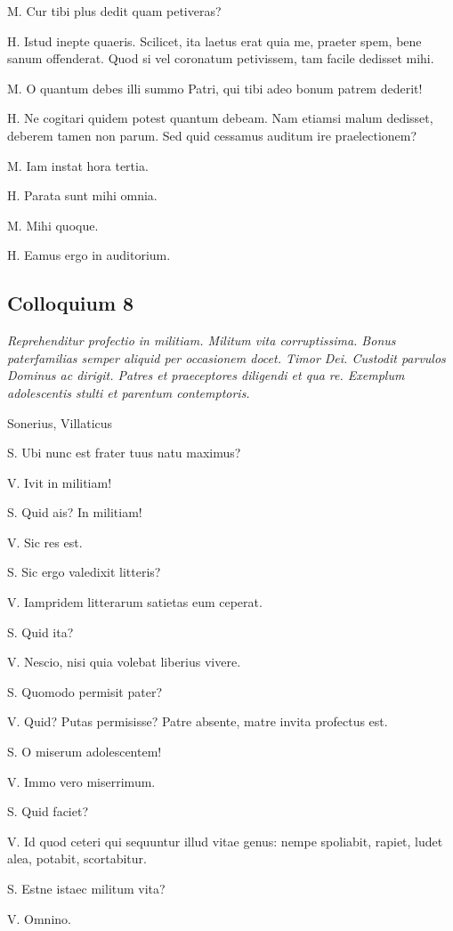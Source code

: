 \documentclass{article}
\begin{document}
M. Cur tibi plus dedit quam petiveras?

H. Istud inepte quaeris. Scilicet, ita laetus erat quia me, praeter spem, bene sanum offenderat. Quod si vel coronatum petivissem, tam facile dedisset mihi.

M. O quantum debes illi summo Patri, qui tibi adeo bonum patrem dederit!

H. Ne cogitari quidem potest quantum debeam. Nam etiamsi malum dedisset, deberem tamen non parum. Sed quid cessamus auditum ire praelectionem?

M. Iam instat hora tertia.

H. Parata sunt mihi omnia.

M. Mihi quoque.

H. Eamus ergo in auditorium.

\subsection{Colloquium 8}
\emph{Reprehenditur profectio in militiam. Militum vita corruptissima. Bonus paterfamilias semper aliquid per occasionem docet. Timor Dei. Custodit parvulos Dominus ac dirigit. Patres et praeceptores diligendi et qua re. Exemplum adolescentis stulti et parentum contemptoris.}

Sonerius, Villaticus

S. Ubi nunc est frater tuus natu maximus?

V. Ivit in militiam!

S. Quid ais? In militiam!

V. Sic res est.

S. Sic ergo valedixit litteris?

V. Iampridem litterarum satietas eum ceperat.

S. Quid ita?

V. Nescio, nisi quia volebat liberius vivere.

S. Quomodo permisit pater?

V. Quid? Putas permisisse? Patre absente, matre invita profectus est.

S. O miserum adolescentem!

V. Immo vero miserrimum.

S. Quid faciet?

V. Id quod ceteri qui sequuntur illud vitae genus: nempe spoliabit, rapiet, ludet alea, potabit, scortabitur.

S. Estne istaec militum vita?

V. Omnino.
\end{document}
